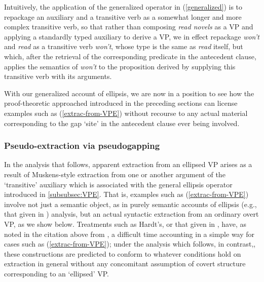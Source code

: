 \documentclass[output=paper,colorlinks,citecolor=brown]{langscibook}
\begin{document}
\noindent Intuitively, the application of the generalized operator in
(\ref{generalized}) is to repackage an auxiliary and a transitive verb as a
somewhat longer and more complex transitive verb, so that rather than
composing \textit{read novels} as a VP and applying a standardly typed
auxiliary to derive a VP, we in effect repackage \textit{won't} and \textit{read} as
a transitive verb \textit{won't}, whose type is the same as \textit{read} itself,
but which, after the retrieval of the corresponding predicate in the
antecedent clause, applies the semantics of \textit{won't} to the proposition
derived by supplying this transitive verb with its arguments.

With our generalized account of ellipsis, we are now in a position to
see how the proof-theoretic approached introduced in the preceding
sections can license examples such as (\ref{extrac-from-VPE}) without
recourse to any actual material corresponding to the gap `site' in the
antecedent clause ever being involved.

\subsubsection{Pseudo-extraction via pseudogapping}\label{subsubsec:pseudoextrac}

In the analysis that follows, apparent extraction from an ellipsed VP
arises as a result of Muskens-style extraction from one or another
argument of the `transitive' auxiliary which is associated with the
general ellipsis operator introduced in
\textsection\ref{subsubsec:VPE}. That is, examples such as
(\ref{extrac-from-VPE}) involve not just a semantic object, as in purely
semantic accounts of ellipsis (e.g., that given in \citealt{hardt-diss})
analysis, but an actual syntactic extraction from an ordinary overt
VP, as we show below. Treatments such as Hardt's, or that given in
\citet{dalrymple-etal1991}, have, as noted in the citation above from
\citet{Elbourne2008}, a difficult time accounting in a simple way for cases
such as (\ref{extrac-from-VPE}); under the analysis which follows, in
contrast,, these constructions are predicted to conform to whatever
conditions hold on extraction in general without any concomitant
assumption of covert structure corresponding to an `ellipsed' VP.
\end{document}
